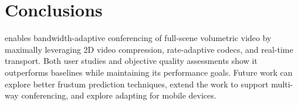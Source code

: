 \section{Conclusions}
\label{s:conclusions}

\livo enables bandwidth-adaptive conferencing of full-scene volumetric video by maximally leveraging 2D video compression, rate-adaptive codecs, and real-time transport.
%
Both user studies and objective quality assessments show it outperforms baselines while maintaining its performance goals.
%
Future work can explore better frustum prediction techniques, extend the work to support multi-way conferencing, and explore adapting \livo for mobile devices.